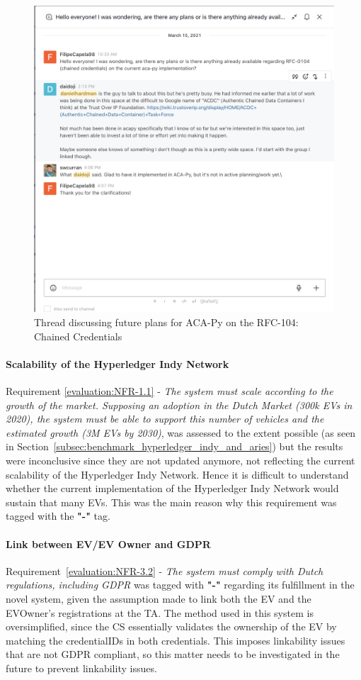 \begin{figure}[!htb]
    \centering
    \includegraphics[width=0.7\linewidth]{images/Delegated_creds.png}
    \caption{Thread discussing future plans for ACA-Py on the RFC-104: Chained Credentials}
    \label{fig:delegated_creds}
\end{figure}

\paragraph{Scalability of the Hyperledger Indy Network}

Requirement \ref{evaluation:NFR-1.1} - \textit{The system must scale according to the growth of the market. Supposing an adoption in the Dutch Market (300k EVs in 2020), the system must be able to support this number of vehicles and the estimated growth (3M EVs by 2030)}, was assessed to the extent possible (as seen in Section~\ref{subsec:benchmark_hyperledger_indy_and_aries}) but the results were inconclusive since they are not updated anymore, not reflecting the current scalability of the Hyperledger Indy Network. Hence it is difficult to understand whether the current implementation of the Hyperledger Indy Network would sustain that many EVs. This was the main reason why this requirement was tagged with the \textbf{"-"} tag.

\paragraph{Link between EV/EV Owner and GDPR}

Requirement~\ref{evaluation:NFR-3.2} - \textit{The system must comply with Dutch regulations, including GDPR} was tagged with \textbf{"-"} regarding its fulfillment in the novel system, given the assumption made to link both the EV and the EVOwner's registrations at the TA. The method used in this system is oversimplified, since the CS essentially validates the ownership of the EV by matching the credentialIDs in both credentials. This imposes linkability issues that are not GDPR compliant, so this matter needs to be investigated in the future to prevent linkability issues.

